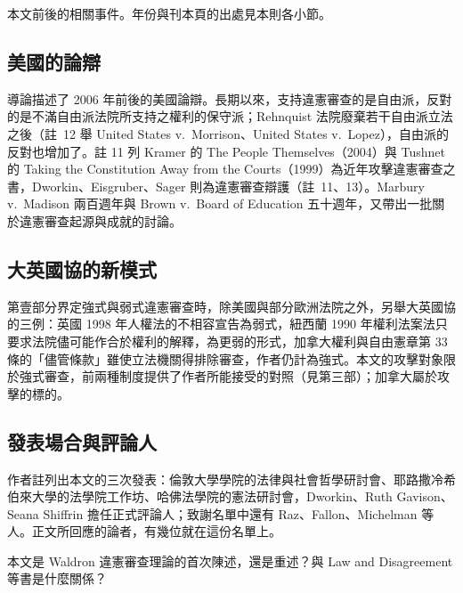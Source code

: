 \begin{qafigure}{本文前後的相關事件。年份與刊本頁的出處見本則各小節。\label{fig:timeline}}

\end{qafigure}

\subsection{美國的論辯}

導論描述了 2006 年前後的美國論辯。長期以來，支持違憲審查的是自由派，反對的是不滿自由派法院所支持之權利的保守派；Rehnquist 法院廢棄若干自由派立法之後（註~12 舉 United States v.\ Morrison、United States v.\ Lopez），自由派的反對也增加了。註 11 列 Kramer 的 The People Themselves（2004）與 Tushnet 的 Taking the Constitution Away from the Courts（1999）為近年攻擊違憲審查之書，Dworkin、Eisgruber、Sager 則為違憲審查辯護（註~\mbox{11、13}）。Marbury v.\ Madison 兩百週年與 Brown v.\ Board of Education 五十週年，又帶出一批關於違憲審查起源與成就的討論。

\subsection{大英國協的新模式}

第壹部分界定強式與弱式違憲審查時，除美國與部分歐洲法院之外，另舉大英國協的三例：英國 1998 年人權法的不相容宣告為弱式，紐西蘭 1990 年權利法案法只要求法院儘可能作合於權利的解釋，為更弱的形式，加拿大權利與自由憲章第 33 條的「儘管條款」雖使立法機關得排除審查，作者仍計為強式。本文的攻擊對象限於強式審查，前兩種制度提供了作者所能接受的對照（見第三部）；加拿大屬於攻擊的標的。

\subsection{發表場合與評論人}

作者註列出本文的三次發表：倫敦大學學院的法律與社會哲學研討會、耶路撒冷希伯來大學的法學院工作坊、哈佛法學院的憲法研討會，Dworkin、Ruth Gavison、Seana Shiffrin 擔任正式評論人；致謝名單中還有 Raz、Fallon、Michelman 等人。正文所回應的論者，有幾位就在這份名單上。


\begin{qaquestion}
本文是 Waldron 違憲審查理論的首次陳述，還是重述？與 Law and Disagreement 等書是什麼關係？
\end{qaquestion}

